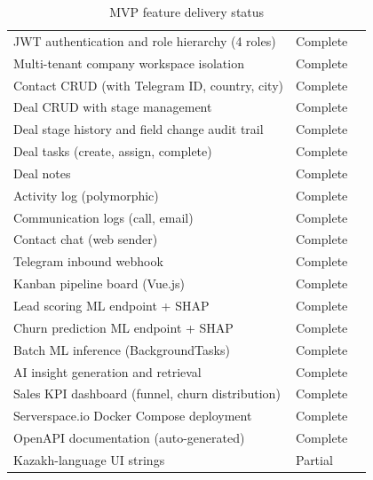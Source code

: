 \begin{table}[H]
  \centering
  \caption{MVP feature delivery status}
  \label{tab:mvp_features}
  \begin{tabularx}{\textwidth}{@{}X C{2.0cm} C{2.4cm}@{}}
    \toprule
     &  \\
    \midrule
    JWT authentication and role hierarchy (4 roles)  & Complete \\
    Multi-tenant company workspace isolation         & Complete \\
    Contact CRUD (with Telegram ID, country, city)   & Complete \\
    Deal CRUD with stage management                  & Complete \\
    Deal stage history and field change audit trail  & Complete \\
    Deal tasks (create, assign, complete)            & Complete \\
    Deal notes                                       & Complete \\
    Activity log (polymorphic)                       & Complete \\
    Communication logs (call, email)                 & Complete \\
    Contact chat (web sender)                        & Complete \\
    Telegram inbound webhook                         & Complete \\
    Kanban pipeline board (Vue.js)                   & Complete \\
    Lead scoring ML endpoint + SHAP                  & Complete \\
    Churn prediction ML endpoint + SHAP              & Complete \\
    Batch ML inference (BackgroundTasks)             & Complete \\
    AI insight generation and retrieval              & Complete \\
    Sales KPI dashboard (funnel, churn distribution) & Complete \\
    Serverspace.io Docker Compose deployment         & Complete \\
    OpenAPI documentation (auto-generated)           & Complete \\
    Kazakh-language UI strings                       & Partial  \\
    \bottomrule
  \end{tabularx}
\end{table}
